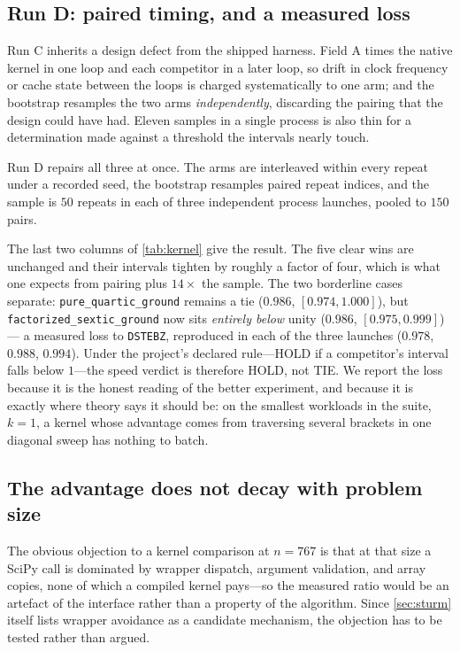 \documentclass[twocolumn,10pt,a4paper]{article}
\theoremstyle{plain}
\theoremstyle{definition}
\newcommand{\HOLD}{\textsf{HOLD}}
\begin{document}
\subsection{Run D: paired timing, and a measured loss}
\label{sec:paired}

Run C inherits a design defect from the shipped harness. Field A times the
native kernel in one loop and each competitor in a later loop, so drift in clock
frequency or cache state between the loops is charged systematically to one arm;
and the bootstrap resamples the two arms \emph{independently}, discarding the
pairing that the design could have had. Eleven samples in a single process is
also thin for a determination made against a threshold the intervals nearly
touch.

Run D repairs all three at once. The arms are interleaved within every repeat
under a recorded seed, the bootstrap resamples paired repeat indices, and the
sample is $50$ repeats in each of three independent process launches, pooled to
$150$ pairs.

The last two columns of \cref{tab:kernel} give the result. The five clear wins
are unchanged and their intervals tighten by roughly a factor of four, which is
what one expects from pairing plus $14\times$ the sample. The two borderline
cases separate: \texttt{pure\_quartic\_ground} remains a tie
($0.986$, $[0.974,1.000]$), but \texttt{factorized\_sextic\_ground} now sits
\emph{entirely below} unity ($0.986$, $[0.975,0.999]$) --- a measured loss to
\texttt{DSTEBZ}, reproduced in each of the three launches
($0.978$, $0.988$, $0.994$). Under the project's declared rule---\HOLD{} if a
competitor's interval falls below $1$---the speed verdict is therefore \HOLD{},
not \textsf{TIE}. We report the loss because it is the honest reading of the
better experiment, and because it is exactly where theory says it should be: on
the smallest workloads in the suite, $k = 1$, a kernel whose advantage comes
from traversing several brackets in one diagonal sweep has nothing to batch.

\subsection{The advantage does not decay with problem size}
\label{sec:scaling}

The obvious objection to a kernel comparison at $n = 767$ is that at that size a
SciPy call is dominated by wrapper dispatch, argument validation, and array
copies, none of which a compiled kernel pays---so the measured ratio would be an
artefact of the interface rather than a property of the algorithm. Since
\cref{sec:sturm} itself lists wrapper avoidance as a candidate mechanism, the
objection has to be tested rather than argued.
\end{document}
